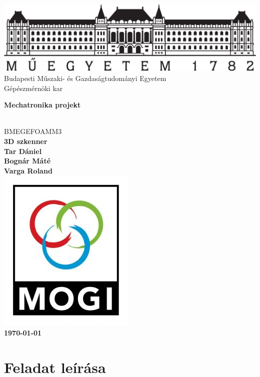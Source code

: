 \documentclass[12pt,a4paper]{article}
\begin{document}
\thispagestyle{empty}
\begin{center}
\includegraphics[scale=0.3]{bme.pdf}\\
\large{Budapesti Műszaki- és Gazdaságtudományi Egyetem\\
Gépészmérnöki kar}\\[1cm]
\begin{Huge}
\textbf{Mechatronika projekt}
\end{Huge}\\[0.5cm]

\Large{BMEGEFOAMM3}\\[2cm]
\Huge{\bf{3D szkenner}}\\[2.5cm]
\bf{\Large{Tar Dániel\\[5pt]
		Bognár Máté\\
		Varga Roland}}\\[1cm]

\includegraphics[scale=0.5]{mogilogo.jpg}\\[1cm]
\large{\today}
\end{center}
\newpage
\tableofcontents
\newpage
\pagestyle{fancy}
\fancyhf{}
\section{Feladat leírása}
\end{document}
